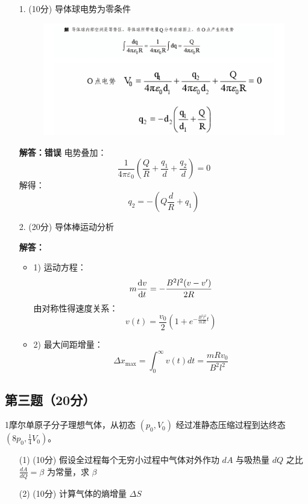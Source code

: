 \documentclass{article}
\begin{document}
\begin{enumerate}
  \item[1.] (10分) 导体球电势为零条件
  \begin{figure}[H]
      \centering
      \includegraphics[width=1.4\linewidth]{Screenshot_20250414_090905.jpg}
  \end{figure}
  \textbf{解答：错误}
  电势叠加：
  $$
  \frac{1}{4\pi\varepsilon_0}\left( \frac{Q}{R} + \frac{q_1}{d} + \frac{q_2}{d} \right) = 0
  $$
  解得：
  $$
  q_2 = -\left( Q\frac{d}{R} + q_1 \right)
  $$

  \item[2.] (20分) 导体棒运动分析
  
  \textbf{解答：}
  \begin{itemize}
    \item 1) 运动方程：
    $$
    m\dv{v}{t} = -\frac{B^2l^2(v-v')}{2R}
    $$
    由对称性得速度关系：
    $$
    v(t) = \frac{v_0}{2}(1 + e^{-\frac{B^2l^2}{mR}t})
    $$
    
    \item 2) 最大间距增量：
    $$
    \Delta x_{\text{max}} = \int_0^\infty v(t)dt = \frac{mRv_0}{B^2l^2}
    $$
  \end{itemize}
\end{enumerate}
\subsection*{第三题（20分）}
1摩尔单原子分子理想气体，从初态 $(p_0, V_0)$ 经过准静态压缩过程到达终态 $(8p_0, \frac{1}{4}V_0)$。

\begin{enumerate}
  \item[(1)] (10分) 假设全过程每个无穷小过程中气体对外作功 $dA$ 与吸热量 $dQ$ 之比 $\frac{dA}{dQ} = \beta$ 为常量，求 $\beta$
  
  \item[(2)] (10分) 计算气体的熵增量 $\Delta S$
\end{enumerate}
\end{document}
